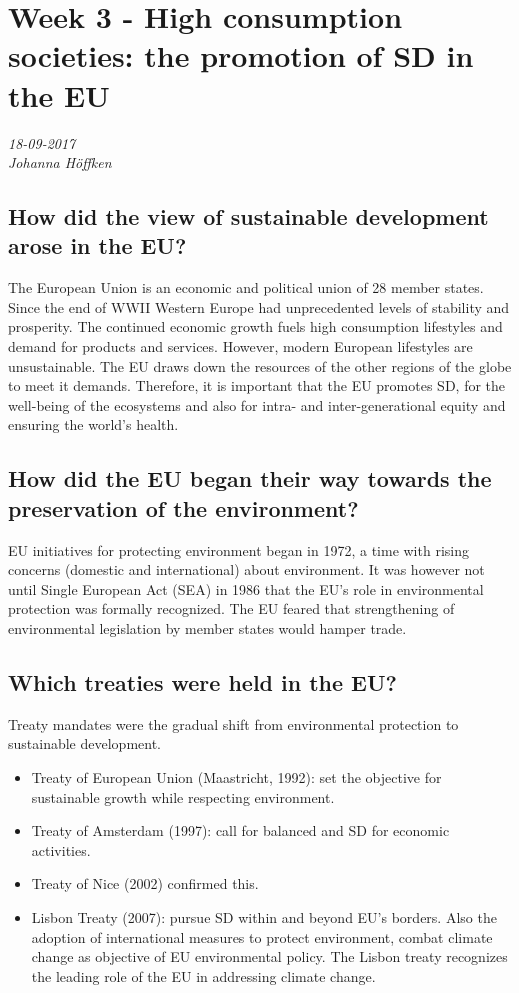 \chapter{Week 3 - High consumption societies: the promotion of SD in the EU}
\textit{18-09-2017 \\
Johanna Höffken}

\section{How did the view of sustainable development arose in the EU?}
The European Union is an economic and political union of 28 member states. Since the end of WWII Western Europe had unprecedented levels of stability and prosperity. The continued economic growth fuels high consumption lifestyles and demand for products and services. However, modern European lifestyles are unsustainable. The EU draws down the resources of the other regions of the globe to meet it demands. Therefore, it is important that the EU promotes SD, for the well-being of the ecosystems and also for intra- and inter-generational equity and ensuring the world's health. 

\section{How did the EU began their way towards the preservation of the environment?}
EU initiatives for protecting environment began in 1972, a time with rising concerns (domestic and international) about environment. It was however not until Single European Act (SEA) in 1986 that the EU’s role in environmental protection was formally recognized. The EU feared that strengthening of environmental legislation by member states would hamper trade. 

\section{Which treaties were held in the EU?}
Treaty mandates were the gradual shift from environmental protection to sustainable development. 
\begin{itemize}
\item Treaty of European Union (Maastricht, 1992): set the objective for sustainable growth while respecting environment.
\item Treaty of Amsterdam (1997): call for balanced and SD for economic activities.
\item Treaty of Nice (2002) confirmed this.
\item Lisbon Treaty (2007): pursue SD within and beyond EU’s borders. Also the adoption of international measures to protect environment, combat climate change as objective of EU environmental policy. The Lisbon treaty recognizes the leading role of the EU  in addressing climate change. 
\end{itemize}

